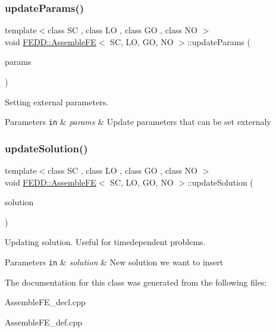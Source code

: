 \subsubsection{\texorpdfstring{update\+Params()}{updateParams()}}
{\footnotesize\ttfamily template$<$class SC , class LO , class GO , class NO $>$ \\
void \hyperlink{classFEDD_1_1AssembleFE}{F\+E\+D\+D\+::\+Assemble\+FE}$<$ SC, LO, GO, NO $>$\+::update\+Params (\begin{DoxyParamCaption}\item[{Parameter\+List\+Ptr\+\_\+\+Type}]{params }\end{DoxyParamCaption})}



Setting external parameters. 


\begin{DoxyParams}[1]{Parameters}
\mbox{\tt in}  & {\em params} & Update parameters that can be set externaly \\
\hline
\end{DoxyParams}
\mbox{\label{classFEDD_1_1AssembleFE_a5303adf0752fe27d9ff47ae8a39c1da4}} 
\subsubsection{\texorpdfstring{update\+Solution()}{updateSolution()}}
{\footnotesize\ttfamily template$<$class SC , class LO , class GO , class NO $>$ \\
void \hyperlink{classFEDD_1_1AssembleFE}{F\+E\+D\+D\+::\+Assemble\+FE}$<$ SC, LO, GO, NO $>$\+::update\+Solution (\begin{DoxyParamCaption}\item[{vec\+\_\+dbl\+\_\+\+Type}]{solution }\end{DoxyParamCaption})}



Updating solution. Useful for timedependent problems. 


\begin{DoxyParams}[1]{Parameters}
\mbox{\tt in}  & {\em solution} & New solution we want to insert \\
\hline
\end{DoxyParams}


The documentation for this class was generated from the following files\+:\begin{DoxyCompactItemize}
\item 
Assemble\+F\+E\+\_\+decl.\+cpp\item 
Assemble\+F\+E\+\_\+def.\+cpp\end{DoxyCompactItemize}
